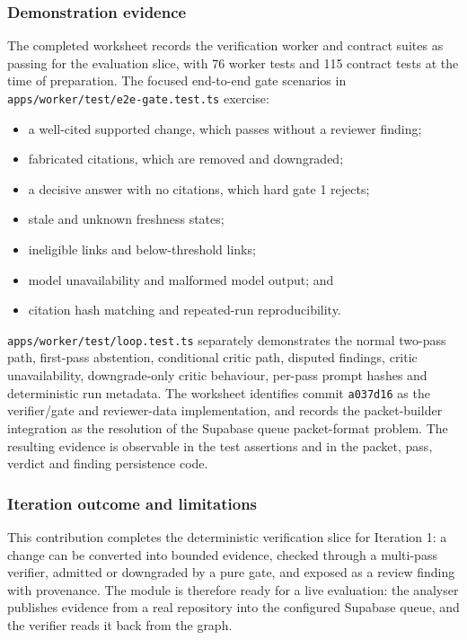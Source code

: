 \subsubsection{Demonstration evidence}

The completed worksheet records the verification worker and contract suites as
passing for the evaluation slice, with 76 worker tests and 115 contract tests
at the time of preparation. The focused end-to-end gate scenarios in
\texttt{apps/worker/test/e2e-gate.test.ts} exercise:

\begin{itemize}
  \item a well-cited supported change, which passes without a reviewer finding;
  \item fabricated citations, which are removed and downgraded;
  \item a decisive answer with no citations, which hard gate 1 rejects;
  \item stale and unknown freshness states;
  \item ineligible links and below-threshold links;
  \item model unavailability and malformed model output; and
  \item citation hash matching and repeated-run reproducibility.
\end{itemize}

\texttt{apps/worker/test/loop.test.ts} separately demonstrates the normal
two-pass path, first-pass abstention, conditional critic path, disputed
findings, critic unavailability, downgrade-only critic behaviour, per-pass
prompt hashes and deterministic run metadata. The worksheet identifies commit
\texttt{a037d16} as the verifier/gate and reviewer-data implementation, and
records the packet-builder integration as the resolution of the Supabase queue
packet-format problem. The resulting evidence is observable in the test
assertions and in the packet, pass, verdict and finding persistence code.

\subsubsection{Iteration outcome and limitations}

This contribution completes the deterministic verification slice for Iteration
1: a change can be converted into bounded evidence, checked through a
multi-pass verifier, admitted or downgraded by a pure gate, and exposed as a
review finding with provenance. The module is therefore ready for a live
evaluation: the analyser publishes evidence from a real repository into the
configured Supabase queue, and the verifier reads it back from the graph.

